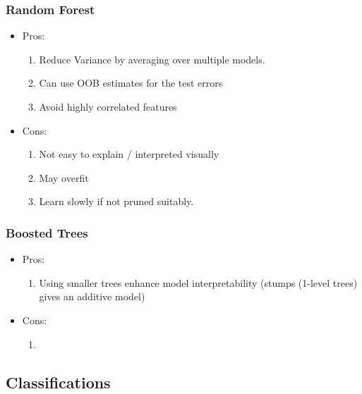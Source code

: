 \documentclass[12pt]{amsart}
\numberwithin{equation}{section}
\theoremstyle{plain}
\theoremstyle{definition}
\begin{document}
\subsubsection{Random Forest}

\begin{itemize}
\item Pros: 
\begin{enumerate}
\item Reduce Variance by averaging over multiple models.
\item Can use OOB estimates for the test errors
\item Avoid highly correlated features
\end{enumerate}

\item Cons:

\begin{enumerate}
\item Not easy to explain / interpreted visually
\item May overfit
\item Learn slowly if not pruned suitably.
\end{enumerate}

\end{itemize}

\subsubsection{Boosted Trees}

\begin{itemize}
\item Pros: 

\begin{enumerate}
\item Using smaller trees enhance model interpretability (stumps (1-level trees) gives an additive model)
\end{enumerate}

\item Cons:

\begin{enumerate}
\item
\end{enumerate}

\end{itemize}


\subsection{Classifications}
\end{document}
